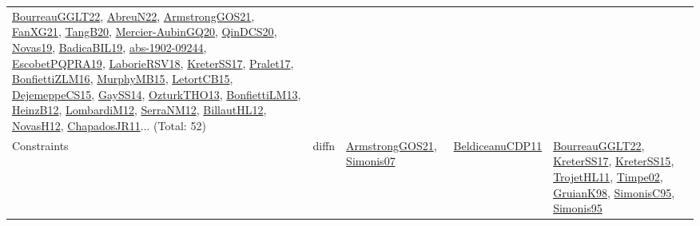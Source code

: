 {\begin{longtable}{lp{3cm}>{\raggedright}p{6cm}>{\raggedright}p{6cm}p{8cm}}
\href{articles/BourreauGGLT22.pdf}{BourreauGGLT22}\cite{BourreauGGLT22}, \href{articles/AbreuN22.pdf}{AbreuN22}\cite{AbreuN22}, \href{papers/ArmstrongGOS21.pdf}{ArmstrongGOS21}\cite{ArmstrongGOS21}, \href{articles/FanXG21.pdf}{FanXG21}\cite{FanXG21}, \href{papers/TangB20.pdf}{TangB20}\cite{TangB20}, \href{papers/Mercier-AubinGQ20.pdf}{Mercier-AubinGQ20}\cite{Mercier-AubinGQ20}, \href{articles/QinDCS20.pdf}{QinDCS20}\cite{QinDCS20}, \href{articles/Novas19.pdf}{Novas19}\cite{Novas19}, \href{papers/BadicaBIL19.pdf}{BadicaBIL19}\cite{BadicaBIL19}, \href{articles/abs-1902-09244.pdf}{abs-1902-09244}\cite{abs-1902-09244}, \href{articles/EscobetPQPRA19.pdf}{EscobetPQPRA19}\cite{EscobetPQPRA19}, \href{articles/LaborieRSV18.pdf}{LaborieRSV18}\cite{LaborieRSV18}, \href{articles/KreterSS17.pdf}{KreterSS17}\cite{KreterSS17}, \href{papers/Pralet17.pdf}{Pralet17}\cite{Pralet17}, \href{papers/BonfiettiZLM16.pdf}{BonfiettiZLM16}\cite{BonfiettiZLM16}, \href{papers/MurphyMB15.pdf}{MurphyMB15}\cite{MurphyMB15}, \href{articles/LetortCB15.pdf}{LetortCB15}\cite{LetortCB15}, \href{papers/DejemeppeCS15.pdf}{DejemeppeCS15}\cite{DejemeppeCS15}, \href{papers/GaySS14.pdf}{GaySS14}\cite{GaySS14}, \href{articles/OzturkTHO13.pdf}{OzturkTHO13}\cite{OzturkTHO13}, \href{papers/BonfiettiLM13.pdf}{BonfiettiLM13}\cite{BonfiettiLM13}, \href{papers/HeinzB12.pdf}{HeinzB12}\cite{HeinzB12}, \href{articles/LombardiM12.pdf}{LombardiM12}\cite{LombardiM12}, \href{papers/SerraNM12.pdf}{SerraNM12}\cite{SerraNM12}, \href{papers/BillautHL12.pdf}{BillautHL12}\cite{BillautHL12}, \href{articles/NovasH12.pdf}{NovasH12}\cite{NovasH12}, \href{papers/ChapadosJR11.pdf}{ChapadosJR11}\cite{ChapadosJR11}... (Total: 52)\\
Constraints & diffn & \href{papers/ArmstrongGOS21.pdf}{ArmstrongGOS21}\cite{ArmstrongGOS21}, \href{articles/Simonis07.pdf}{Simonis07}\cite{Simonis07} & \href{articles/BeldiceanuCDP11.pdf}{BeldiceanuCDP11}\cite{BeldiceanuCDP11} & \href{articles/BourreauGGLT22.pdf}{BourreauGGLT22}\cite{BourreauGGLT22}, \href{articles/KreterSS17.pdf}{KreterSS17}\cite{KreterSS17}, \href{papers/KreterSS15.pdf}{KreterSS15}\cite{KreterSS15}, \href{articles/TrojetHL11.pdf}{TrojetHL11}\cite{TrojetHL11}, \href{articles/Timpe02.pdf}{Timpe02}\cite{Timpe02}, \href{papers/GruianK98.pdf}{GruianK98}\cite{GruianK98}, \href{papers/SimonisC95.pdf}{SimonisC95}\cite{SimonisC95}, \href{papers/Simonis95.pdf}{Simonis95}\cite{Simonis95}\\

\end{longtable}}
